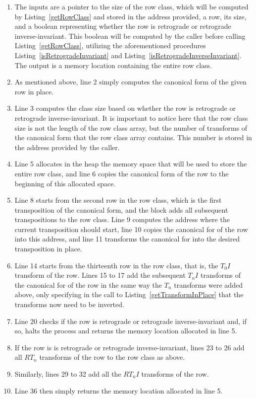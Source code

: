 \begin{enumerate}
\item The inputs are a pointer to the size of the row class, which will be computed by Listing~\ref{getRowClass} and stored in the address provided, a row, its size, and a boolean representing whether the row is retrograde or retrograde inverse-invariant. This boolean will be computed by the caller before calling Listing~\ref{getRowClass}, utilizing the aforementioned procedures Listing~\ref{isRetrogradeInvariant} and Listing~\ref{isRetrogradeInverseInvariant}. The output is a memory location containing the entire row class.
\item As mentioned above, line 2 simply computes the canonical form of the given row in place.
\item Line 3 computes the class size based on whether the row is retrograde or retrograde inverse-invariant. It is important to notice here that the row class size is not the length of the row class array, but the number of transforms of the canonical form that the row class array contains. This number is stored in the address provided by the caller.
\addtocounter{enumi}{1}
\item Line 5 allocates in the heap the memory space that will be used to store the entire row class, and line 6 copies the canonical form of the row to the beginning of this allocated space.
\addtocounter{enumi}{2}
\item Line 8 starts from the second row in the row class, which is the first transposition of the canonical form, and the block adds all subsequent transpositions to the row class. Line 9 computes the address where the current transposition should start, line 10 copies the canonical for of the row into this address, and line 11 transforms the canonical for into the desired transposition in place. 
\addtocounter{enumi}{5}
\item Line 14 starts from the thirteenth row in the row class, that is, the $T_0I$ transform of the row. Lines 15 to 17 add the subsequent $T_nI$ transforms of the canonical for of the row in the same way the $T_n$ transforms were added above, only specifying in the call to Listing~\ref{getTransformInPlace} that the transforms now need to be inverted.
\addtocounter{enumi}{5}
\item Line 20 checks if the row is retrograde or retrograde inverse-invariant and, if so, halts the process and returns the memory location allocated in line 5.
\addtocounter{enumi}{2}
\item If the row is is retrograde or retrograde inverse-invariant, lines 23 to 26 add all $RT_n$ transforms of the row to the row class as above.
\addtocounter{enumi}{5}
\item Similarly, lines 29 to 32 add all the $RT_nI$ transforms of the row.
\addtocounter{enumi}{5}
\item Line 36 then simply returns the memory location allocated in line 5.
\end{enumerate}

